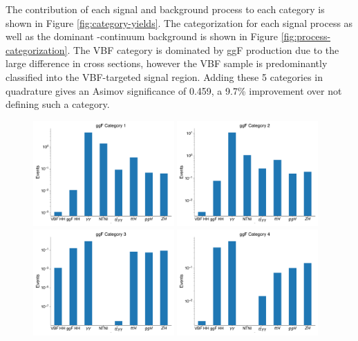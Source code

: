 The contribution of each signal and background process to each category is shown in Figure \ref{fig:category-yields}. The categorization for each signal process as well as the dominant \yy-continuum background is shown in Figure \ref{fig:process-categorization}. The \gls{VBF} \hh category is dominated by \gls{ggF} production due to the large difference in cross sections, however the \gls{VBF} \hh sample is predominantly classified into the \gls{VBF}-targeted signal region. Adding these 5 categories in quadrature gives an Asimov significance of 0.459, a 9.7\% improvement over not defining such a category.

\begin{figure}[p!]
  \centering
  \includegraphics[width=0.48\textwidth]{chapters/chapter6_vbf/images/category_breakdown/ggfcat1.pdf}
  \includegraphics[width=0.48\textwidth]{chapters/chapter6_vbf/images/category_breakdown/ggfcat2.pdf}
  \includegraphics[width=0.48\textwidth]{chapters/chapter6_vbf/images/category_breakdown/ggfcat3.pdf}
  \includegraphics[width=0.48\textwidth]{chapters/chapter6_vbf/images/category_breakdown/ggfcat4.pdf}

\end{figure}
